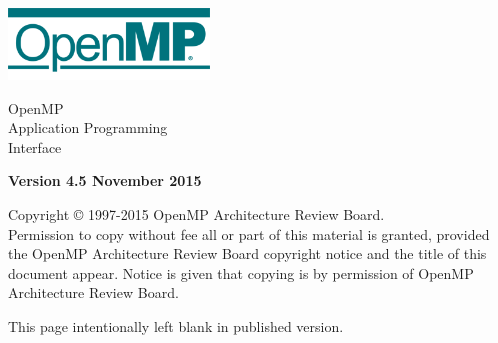 
  \begin{titlepage}
    \begin{flushleft}
     \hspace{-6em} \includegraphics[width=0.4\textwidth]{openmp-logo.png}
    \end{flushleft}

    \begin{adjustwidth}{-0.75in}{0in}
    \begin{center}
      \Huge
      \textsf{OpenMP\\Application Programming\\Interface}

      \vspace{0.5in}\textsf{    }\vspace{-0.7in}
      \normalsize

      \vspace{1.0in}

      \textbf{Version 4.5 November 2015}
    \end{center}
    \end{adjustwidth}

    \vspace{3.0in}

\begin{adjustwidth}{0pt}{1em}\setlength{\parskip}{0.25\baselineskip}%
Copyright © 1997-2015 OpenMP Architecture Review Board.\\
Permission to copy without fee all or part of this material is granted,
provided the OpenMP Architecture Review Board copyright notice and
the title of this document appear. Notice is given that copying is by
permission of OpenMP Architecture Review Board.\end{adjustwidth}

  \end{titlepage}


\clearpage
\thispagestyle{empty}
\phantom{a}
This page intentionally left blank in published version.



\vfill

